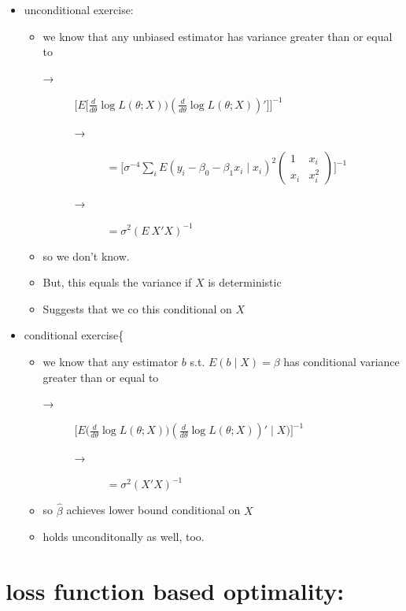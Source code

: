 \documentclass[11pt]{article}
\begin{document}
\begin{itemize}
\begin{itemize}
\begin{itemize}
\item unconditional exercise:
\begin{itemize}
\item we know that any unbiased estimator has variance greater than or equal to
\begin{description}
\item[→] $\Big[E \Big[\tfrac{d}{d\theta} \log L(\theta; X)) (\tfrac{d}{d\theta} \log L(\theta; X))'\Big]\Big]^{-1}$
\begin{description}
\item[→] $=\Big[\sigma^{-4} \sum_i E (y_i - \beta_0 - \beta_1 x_i \mid x_i)^2 \begin{pmatrix} 1 & x_i \\ x_i & x_i^2 \end{pmatrix}\Big]^{-1}$
\item[→] $= \sigma^2 (E\ X'X)^{-1}$
\end{description}
\end{description}
\item so we don't know.
\item But, this equals the variance if $X$ is deterministic
\item Suggests that we co this conditional on $X$
\end{itemize}
\item conditional exercise\{
\begin{itemize}
\item we know that any estimator $b$ s.t. $E(b \mid X) = \beta$ has conditional variance greater than or equal to
\begin{description}
\item[→] $\Big[E\Big(\tfrac{d}{d\theta} \log L(\theta; X)) (\tfrac{d}{d\theta} \log L(\theta; X))' \mid X\Big)\Big]^{-1}$
\begin{description}
\item[→] $= \sigma^2 (X'X)^{-1}$
\end{description}
\end{description}
\item so $\hat\beta$ achieves lower bound conditional on $X$
\item holds unconditonally as well, too.
\end{itemize}
\end{itemize}
\end{itemize}
\end{itemize}
\section{loss function based optimality:}
\label{sec-4}
\end{document}
